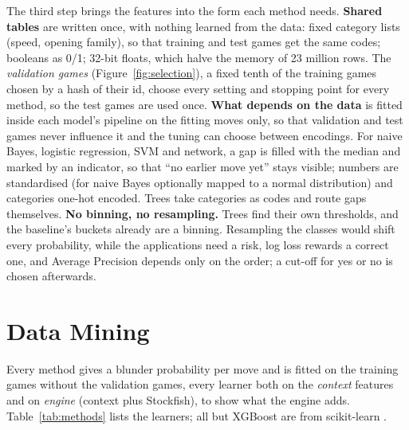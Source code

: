 \documentclass[a4paper,oneside,bibliography=totoc]{scrbook}
\begin{document}
The third step brings the features into the form each method needs. \textbf{Shared tables} are written once,
with nothing learned from the data: fixed category lists (speed, opening family), so that training and test
games get the same codes; booleans as 0/1; 32-bit floats, which halve the memory of 23 million rows. The
\emph{validation games} (Figure~\ref{fig:selection}), a fixed tenth of the training games chosen by a hash of
their id, choose every setting and stopping point for every method, so the test games are used once. \textbf{What
depends on the data} is fitted inside each model's pipeline on the fitting moves only, so that validation and
test games never influence it and the tuning can choose between encodings. For naive Bayes, logistic regression,
SVM and network, a gap is filled with the median and marked by an indicator, so that ``no earlier move yet''
stays visible; numbers are standardised (for naive Bayes optionally mapped to a normal distribution) and
categories one-hot encoded. Trees take categories as codes and route gaps themselves. \textbf{No binning, no
resampling.} Trees find their own thresholds, and the baseline's buckets already are a binning. Resampling the
classes would shift every probability, while the applications need a risk, log loss rewards a correct one, and
Average Precision depends only on the order; a cut-off for yes or no is chosen afterwards.

\chapter{Data Mining}
\label{ch:mining}

Every method gives a blunder probability per move and is fitted on the training games without the validation
games, every learner both on the \emph{context} features and on \emph{engine} (context plus Stockfish), to show
what the engine adds. Table~\ref{tab:methods} lists the learners; all but XGBoost
\cite{chen2016xgboost} are from scikit-learn \cite{pedregosa2011sklearn}.
\end{document}
